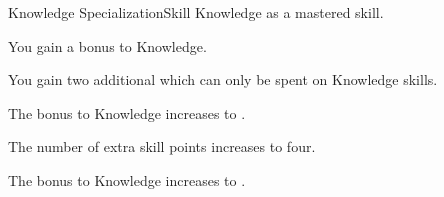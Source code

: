     \begin{feat}{Knowledge Specialization}{Skill}
        \featpre Knowledge as a mastered skill.
        \featben

         You gain a  bonus to Knowledge.

         You gain two additional  which can only be spent on Knowledge skills.

         The bonus to Knowledge increases to .

         The number of extra skill points increases to four.

         The bonus to Knowledge increases to .
    \end{feat}

